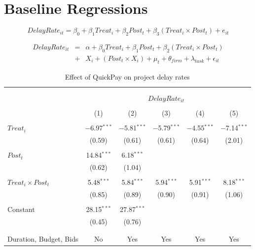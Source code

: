 \documentclass[]{article}
\begin{document}
\hypertarget{baseline-regressions}{%
\section{Baseline Regressions}\label{baseline-regressions}}

\[ DelayRate_{it} = \beta_0 + \beta_1 Treat_i + \beta_2 Post_t + \beta_3 (Treat_i \times Post_t) + e_{it}\]

\[ \begin{aligned} DelayRate_{it} &=& \alpha+\beta_0 Treat_i + \beta_1 Post_t + \beta_2 (Treat_i \times Post_t)\\
&+&  X_i + (Post_t \times X_i) + \mu_t + \theta_{firm} + \lambda_{task}+ \epsilon_{it}
\end{aligned}\]

\begin{table}[H] \centering 
  \caption{Effect of QuickPay on project delay rates} 
  \label{} 
\small 
\begin{tabular}{@{\extracolsep{-2pt}}lccccc} 
\\[-1.8ex]\hline 
\hline \\[-1.8ex] 
\\[-1.8ex] & \multicolumn{5}{c}{$DelayRate_{it}$} \\ 
\\[-1.8ex] & (1) & (2) & (3) & (4) & (5)\\ 
\hline \\[-1.8ex] 
 $Treat_i$ & $-$6.97$^{***}$ & $-$5.81$^{***}$ & $-$5.79$^{***}$ & $-$4.55$^{***}$ & $-$7.14$^{***}$ \\ 
  & (0.59) & (0.61) & (0.61) & (0.64) & (2.01) \\ 
  & & & & & \\ 
 $Post_t$ & 14.84$^{***}$ & 6.18$^{***}$ &  &  &  \\ 
  & (0.62) & (1.04) &  &  &  \\ 
  & & & & & \\ 
 $Treat_i \times Post_t$ & 5.48$^{***}$ & 5.84$^{***}$ & 5.94$^{***}$ & 5.91$^{***}$ & 8.18$^{***}$ \\ 
  & (0.85) & (0.89) & (0.90) & (0.91) & (1.06) \\ 
  & & & & & \\ 
 Constant & 28.15$^{***}$ & 27.87$^{***}$ &  &  &  \\ 
  & (0.45) & (0.76) &  &  &  \\ 
  & & & & & \\ 
\hline \\[-1.8ex] 
Duration, Budget, Bids & No & Yes & Yes & Yes & Yes \\ 

\end{tabular}
\end{table}
\end{document}

